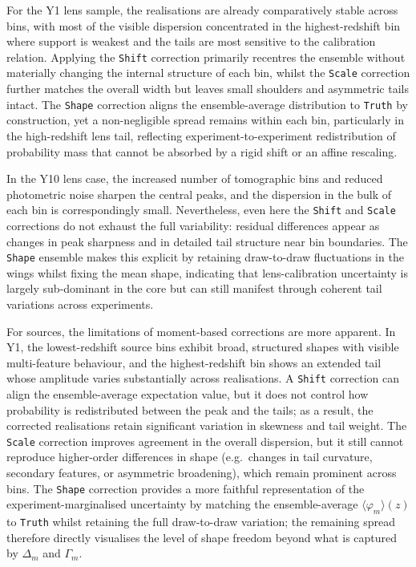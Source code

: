 For the Y1 lens sample, the realisations are already comparatively stable across bins, with most of the visible dispersion concentrated in the highest-redshift bin where support is weakest and the tails are most sensitive to the calibration relation. Applying the \texttt{Shift} correction primarily recentres the ensemble without materially changing the internal structure of each bin, whilst the \texttt{Scale} correction further matches the overall width but leaves small shoulders and asymmetric tails intact. The \texttt{Shape} correction aligns the ensemble-average distribution to \texttt{Truth} by construction, yet a non-negligible spread remains within each bin, particularly in the high-redshift lens tail, reflecting experiment-to-experiment redistribution of probability mass that cannot be absorbed by a rigid shift or an affine rescaling.

In the Y10 lens case, the increased number of tomographic bins and reduced photometric noise sharpen the central peaks, and the dispersion in the bulk of each bin is correspondingly small. Nevertheless, even here the \texttt{Shift} and \texttt{Scale} corrections do not exhaust the full variability: residual differences appear as changes in peak sharpness and in detailed tail structure near bin boundaries. The \texttt{Shape} ensemble makes this explicit by retaining draw-to-draw fluctuations in the wings whilst fixing the mean shape, indicating that lens-calibration uncertainty is largely sub-dominant in the core but can still manifest through coherent tail variations across experiments.

For sources, the limitations of moment-based corrections are more apparent. In Y1, the lowest-redshift source bins exhibit broad, structured shapes with visible multi-feature behaviour, and the highest-redshift bin shows an extended tail whose amplitude varies substantially across realisations. A \texttt{Shift} correction can align the ensemble-average expectation value, but it does not control how probability is redistributed between the peak and the tails; as a result, the corrected realisations retain significant variation in skewness and tail weight. The \texttt{Scale} correction improves agreement in the overall dispersion, but it still cannot reproduce higher-order differences in shape (e.g.\ changes in tail curvature, secondary features, or asymmetric broadening), which remain prominent across bins. The \texttt{Shape} correction provides a more faithful representation of the experiment-marginalised uncertainty by matching the ensemble-average \(\langle \varphi_m \rangle(z)\) to \texttt{Truth} whilst retaining the full draw-to-draw variation; the remaining spread therefore directly visualises the level of shape freedom beyond what is captured by \(\Delta_m\) and \(\Gamma_m\).

